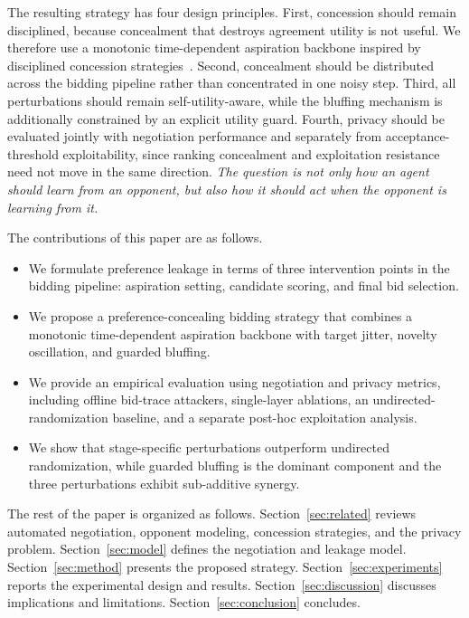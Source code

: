 \documentclass[runningheads]{llncs}
\begin{document}
The resulting strategy has four design principles. First, concession should remain disciplined, because concealment that destroys agreement utility is not useful. We therefore use a monotonic time-dependent aspiration backbone inspired by disciplined concession strategies~\cite{micro_1}. Second, concealment should be distributed across the bidding pipeline rather than concentrated in one noisy step. Third, all perturbations should remain self-utility-aware, while the bluffing mechanism is additionally constrained by an explicit utility guard. Fourth, privacy should be evaluated jointly with negotiation performance and separately from acceptance-threshold exploitability, since ranking concealment and exploitation resistance need not move in the same direction. \emph{The question is not only how an agent should learn from an opponent, but also how it should act when the opponent is learning from it.}

The contributions of this paper are as follows.
\begin{itemize}
    \item We formulate preference leakage in terms of three intervention points in the bidding pipeline: aspiration setting, candidate scoring, and final bid selection.
    \item We propose a preference-concealing bidding strategy that combines a monotonic time-dependent aspiration backbone with target jitter, novelty oscillation, and guarded bluffing.
    \item We provide an empirical evaluation using negotiation and privacy metrics, including offline bid-trace attackers, single-layer ablations, an undirected-randomization baseline, and a separate post-hoc exploitation analysis.
    \item We show that stage-specific perturbations outperform undirected randomization, while guarded bluffing is the dominant component and the three perturbations exhibit sub-additive synergy.
\end{itemize}

The rest of the paper is organized as follows. Section~\ref{sec:related} reviews automated negotiation, opponent modeling, concession strategies, and the privacy problem. Section~\ref{sec:model} defines the negotiation and leakage model. Section~\ref{sec:method} presents the proposed strategy. Section~\ref{sec:experiments} reports the experimental design and results. Section~\ref{sec:discussion} discusses implications and limitations. Section~\ref{sec:conclusion} concludes.
\end{document}
